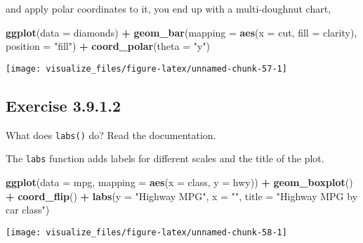 \documentclass[]{book}
\newenvironment{Shaded}{\begin{snugshade}}{\end{snugshade}}
\newcommand{\DataTypeTok}[1]{\textcolor[rgb]{0.13,0.29,0.53}{#1}}
\newcommand{\KeywordTok}[1]{\textcolor[rgb]{0.13,0.29,0.53}{\textbf{#1}}}
\newcommand{\NormalTok}[1]{#1}
\newcommand{\OperatorTok}[1]{\textcolor[rgb]{0.81,0.36,0.00}{\textbf{#1}}}
\newcommand{\StringTok}[1]{\textcolor[rgb]{0.31,0.60,0.02}{#1}}
\theoremstyle{plain}
\theoremstyle{remark}
\begin{document}
and apply polar coordinates to it, you end up with a multi-doughnut
chart,

\begin{Shaded}
\begin{Highlighting}[]
\KeywordTok{ggplot}\NormalTok{(}\DataTypeTok{data =}\NormalTok{ diamonds) }\OperatorTok{+}
\StringTok{  }\KeywordTok{geom_bar}\NormalTok{(}\DataTypeTok{mapping =} \KeywordTok{aes}\NormalTok{(}\DataTypeTok{x =}\NormalTok{ cut, }\DataTypeTok{fill =}\NormalTok{ clarity), }\DataTypeTok{position =} \StringTok{"fill"}\NormalTok{) }\OperatorTok{+}
\StringTok{  }\KeywordTok{coord_polar}\NormalTok{(}\DataTypeTok{theta =} \StringTok{"y"}\NormalTok{)}
\end{Highlighting}
\end{Shaded}

\begin{center}\texttt{[image: visualize\_files/figure-latex/unnamed-chunk-57-1]} \end{center}

\hypertarget{exercise-3.9.1.2}{%
\subsection*{\texorpdfstring{Exercise
{3.9.1.2}}{Exercise 3.9.1.2}}\label{exercise-3.9.1.2}}

What does \texttt{labs()} do? Read the documentation.

The \texttt{labs} function adds labels for different scales and the
title of the plot.

\begin{Shaded}
\begin{Highlighting}[]
\KeywordTok{ggplot}\NormalTok{(}\DataTypeTok{data =}\NormalTok{ mpg, }\DataTypeTok{mapping =} \KeywordTok{aes}\NormalTok{(}\DataTypeTok{x =}\NormalTok{ class, }\DataTypeTok{y =}\NormalTok{ hwy)) }\OperatorTok{+}
\StringTok{  }\KeywordTok{geom_boxplot}\NormalTok{() }\OperatorTok{+}
\StringTok{  }\KeywordTok{coord_flip}\NormalTok{() }\OperatorTok{+}
\StringTok{  }\KeywordTok{labs}\NormalTok{(}\DataTypeTok{y =} \StringTok{"Highway MPG"}\NormalTok{, }\DataTypeTok{x =} \StringTok{""}\NormalTok{, }\DataTypeTok{title =} \StringTok{"Highway MPG by car class"}\NormalTok{)}
\end{Highlighting}
\end{Shaded}

\begin{center}\texttt{[image: visualize\_files/figure-latex/unnamed-chunk-58-1]} \end{center}
\end{document}
